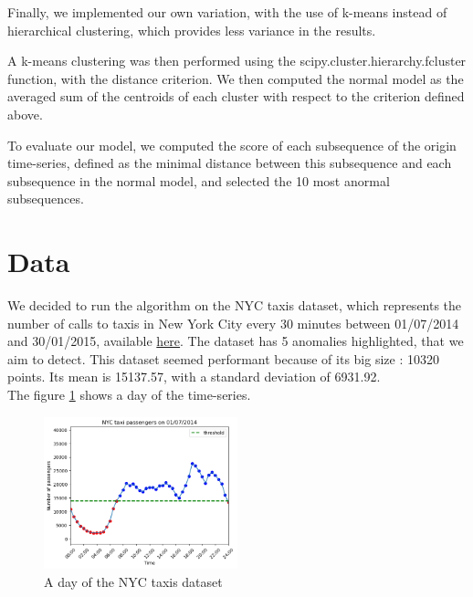 \documentclass[11pt]{article}
\begin{document}
Finally, we implemented our own variation, with the use of k-means instead of hierarchical clustering, which provides less variance in the results. 

A k-means clustering was then performed using the scipy.cluster.hierarchy.fcluster function, with the distance criterion. 
We then computed the normal model as the averaged sum of the centroids of each cluster with respect to the criterion defined above.

To evaluate our model, we computed the score of each subsequence of the origin time-series, defined as the minimal distance between this subsequence and each subsequence in the normal model, and selected the 10 most anormal subsequences.


\section{Data}

We decided to run the algorithm on the NYC taxis dataset, which represents the number of calls to taxis in New York City every 30 minutes between 01/07/2014 and 30/01/2015, available \href{https://github.com/numenta/NAB/blob/master/data/realKnownCause/nyc_taxi.csv}{here}. 
The dataset has 5 anomalies highlighted, that we aim to detect. 
This dataset seemed performant because of its big size : 10320 points. 
Its mean is 15137.57, with a standard deviation of 6931.92. \\
The figure \ref{fig:taxis} shows a day of the time-series.
\begin{figure}[h]
    \centering
    \includegraphics[width=0.5\textwidth]{example_day.png}
    \caption{A day of the NYC taxis dataset}
    \label{fig:taxis}
\end{figure}
\end{document}
